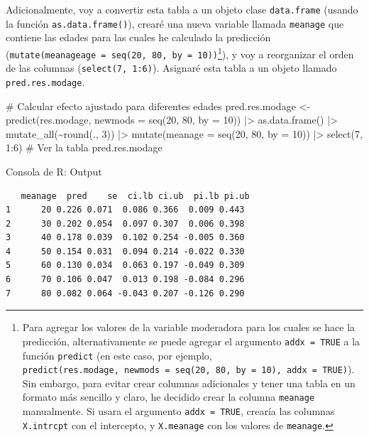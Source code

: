 \documentclass[
  bookmarksnumbered]{article}
\newenvironment{Shaded}{\begin{snugshade}}{\end{snugshade}}
\newcommand{\AttributeTok}[1]{\textcolor[rgb]{0.00,0.34,0.68}{#1}}
\newcommand{\CommentTok}[1]{\textcolor[rgb]{0.54,0.53,0.53}{#1}}
\newcommand{\DecValTok}[1]{\textcolor[rgb]{0.69,0.50,0.00}{#1}}
\newcommand{\FunctionTok}[1]{\textcolor[rgb]{0.39,0.29,0.61}{#1}}
\newcommand{\NormalTok}[1]{\textcolor[rgb]{0.12,0.11,0.11}{#1}}
\newcommand{\OtherTok}[1]{\textcolor[rgb]{0.00,0.43,0.16}{#1}}
\newcommand{\SpecialCharTok}[1]{\textcolor[rgb]{0.24,0.68,0.91}{#1}}
\begin{document}
Adicionalmente, voy a convertir esta tabla a un objeto clase \texttt{data.frame} (usando la función \texttt{as.data.frame()}), crearé una nueva variable llamada \texttt{meanage} que contiene las edades para las cuales he calculado la predicción (\texttt{mutate(meanageage\ =\ seq(20,\ 80,\ by\ =\ 10))}\footnote{Para agregar los valores de la variable moderadora para los cuales se hace la predicción, alternativamente se puede agregar el argumento \texttt{addx\ =\ TRUE} a la función \texttt{predict} (en este caso, por ejemplo, \texttt{predict(res.modage,\ newmods\ =\ seq(20,\ 80,\ by\ =\ 10),\ addx\ =\ TRUE)}). Sin embargo, para evitar crear columnas adicionales y tener una tabla en un formato más sencillo y claro, he decidido crear la columna \texttt{meanage} manualmente. Si usara el argumento \texttt{addx\ =\ TRUE}, crearía las columnas \texttt{X.intrcpt} con el intercepto, y \texttt{X.meanage} con los valores de \texttt{meanage}.}), y voy a reorganizar el orden de las columnas (\texttt{select(7,\ 1:6)}). Asignaré esta tabla a un objeto llamado \texttt{pred.res.modage}.

\begin{Shaded}
\begin{Highlighting}[]
\CommentTok{\# Calcular efecto ajustado para diferentes edades}
\NormalTok{pred.res.modage }\OtherTok{\textless{}{-}} \FunctionTok{predict}\NormalTok{(res.modage, }\AttributeTok{newmods =} \FunctionTok{seq}\NormalTok{(}\DecValTok{20}\NormalTok{, }\DecValTok{80}\NormalTok{, }\AttributeTok{by =} \DecValTok{10}\NormalTok{)) }\SpecialCharTok{|\textgreater{}} 
  \FunctionTok{as.data.frame}\NormalTok{() }\SpecialCharTok{|\textgreater{}} 
  \FunctionTok{mutate\_all}\NormalTok{(}\SpecialCharTok{\textasciitilde{}}\FunctionTok{round}\NormalTok{(., }\DecValTok{3}\NormalTok{)) }\SpecialCharTok{|\textgreater{}} 
  \FunctionTok{mutate}\NormalTok{(}\AttributeTok{meanage =} \FunctionTok{seq}\NormalTok{(}\DecValTok{20}\NormalTok{, }\DecValTok{80}\NormalTok{, }\AttributeTok{by =} \DecValTok{10}\NormalTok{)) }\SpecialCharTok{|\textgreater{}} 
  \FunctionTok{select}\NormalTok{(}\DecValTok{7}\NormalTok{, }\DecValTok{1}\SpecialCharTok{:}\DecValTok{6}\NormalTok{)}
\CommentTok{\# Ver la tabla}
\NormalTok{pred.res.modage}
\end{Highlighting}
\end{Shaded}

\begin{ROut}{Consola de R: Output~\thetcbcounter}
                \begin{footnotesize}
                \begin{verbatim}   meanage  pred    se  ci.lb ci.ub  pi.lb pi.ub
1      20 0.226 0.071  0.086 0.366  0.009 0.443
2      30 0.202 0.054  0.097 0.307  0.006 0.398
3      40 0.178 0.039  0.102 0.254 -0.005 0.360
4      50 0.154 0.031  0.094 0.214 -0.022 0.330
5      60 0.130 0.034  0.063 0.197 -0.049 0.309
6      70 0.106 0.047  0.013 0.198 -0.084 0.296
7      80 0.082 0.064 -0.043 0.207 -0.126 0.290
 \end{verbatim}
                \end{footnotesize}
                \end{ROut}
\end{document}
